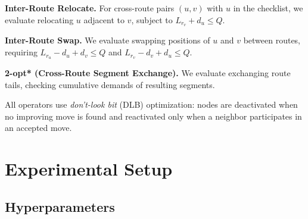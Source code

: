 \documentclass[sigconf,nonacm]{acmart}
\begin{document}
\textbf{Inter-Route Relocate.}
For cross-route pairs $(u, v)$ with $u$ in the checklist, we evaluate relocating $u$ adjacent to $v$, subject to $L_{r_v} + d_u \leq Q$.

\textbf{Inter-Route Swap.}
We evaluate swapping positions of $u$ and $v$ between routes, requiring $L_{r_u} - d_u + d_v \leq Q$ and $L_{r_v} - d_v + d_u \leq Q$.

\textbf{2-opt* (Cross-Route Segment Exchange).}
We evaluate exchanging route tails, checking cumulative demands of resulting segments.

All operators use \emph{don't-look bit} (DLB) optimization: nodes are deactivated when no improving move is found and reactivated only when a neighbor participates in an accepted move.

\section{Experimental Setup}
\label{app:setup}

\subsection{Hyperparameters}
\label{app:repro}
\end{document}
